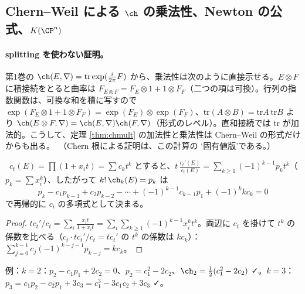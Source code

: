 \subsection{Chern--Weil による $\ch$ の乗法性、Newton の公式、$K(\CP^n)$}
\paragraph{splitting を使わない証明。}第1巻の $\ch(E,\nabla)=\mathrm{tr}\exp(\frac i{2\pi}F)$ から、乗法性は次のように直接示せる。$E\otimes F$ に積接続をとると曲率は $F_{E\otimes F}=F_E\otimes1+1\otimes F_F$（二つの項は可換）。行列の指数関数は、可換な和を積に写すので $\exp(F_E\otimes1+1\otimes F_F)=\exp(F_E)\otimes\exp(F_F)$、$\mathrm{tr}(A\otimes B)=\mathrm{tr}A\,\mathrm{tr}B$ より $\ch(E\otimes F,\nabla)=\ch(E,\nabla)\ch(F,\nabla)$（形式のレベル）。直和接続では $\mathrm{tr}$ が加法的。こうして、定理 \ref{thm:chmult} の加法性と乗法性は Chern--Weil の形式だけからも出る。\tP\ （Chern 根による証明は、この計算の \lq 固有値版\rq である。）

\begin{prop}\label{prop:Newton}\tP\
$c_t(E)=\prod(1+x_it)=\sum c_kt^k$ とすると、$\displaystyle t\,\frac{c_t'(E)}{c_t(E)}=\sum_{k\ge1}(-1)^{k-1}p_kt^k$（$p_k=\sum x_i^k$）、したがって $k!\,\ch_k(E)=p_k$ は
\[
p_k-c_1p_{k-1}+c_2p_{k-2}-\cdots+(-1)^{k-1}c_{k-1}p_1+(-1)^kkc_k=0
\]
で再帰的に $c_i$ の多項式として決まる。
\end{prop}
\begin{proof}
$tc_t'/c_t=\sum_i\frac{x_it}{1+x_it}=\sum_i\sum_{k\ge1}(-1)^{k-1}x_i^kt^k$。両辺に $c_t$ を掛けて $t^k$ の係数を比べる（$c_t\cdot tc_t'/c_t=tc_t'$ の $t^k$ の係数は $kc_k$）：$\sum_{j=0}^{k-1}c_j(-1)^{k-j-1}p_{k-j}=kc_k$。\qedhere
\end{proof}
\noindent 例：$k=2$：$p_2-c_1p_1+2c_2=0$、$p_2=c_1^2-2c_2$、$\ch_2=\frac12(c_1^2-2c_2)$ ✓。$k=3$：$p_3=c_1p_2-c_2p_1+3c_3=c_1^3-3c_1c_2+3c_3$ ✓。

